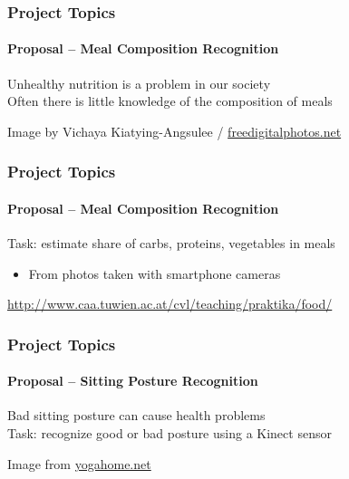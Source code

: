 \documentclass[xetex,professionalfont]{beamer}
\begin{document}
\begin{frame}
\frametitle{Project Topics}
\framesubtitle{Proposal -- Meal Composition Recognition}

Unhealthy nutrition is a problem in our society\\\medskip
Often there is little knowledge of the composition of meals

\bigskip
\begin{center}
	{\centering Image by Vichaya Kiatying-Angsulee / \url{freedigitalphotos.net}}
\end{center}

\end{frame}


\begin{frame}
\frametitle{Project Topics}
\framesubtitle{Proposal -- Meal Composition Recognition}

Task: estimate share of carbs, proteins, vegetables in meals
\begin{itemize}
	\item From photos taken with smartphone cameras
\end{itemize}

\medskip
\begin{center}
	\small\url{http://www.caa.tuwien.ac.at/cvl/teaching/praktika/food/}
\end{center}

\end{frame}


\begin{frame}
\frametitle{Project Topics}
\framesubtitle{Proposal -- Sitting Posture Recognition}

Bad sitting posture can cause health problems\\\medskip
Task: recognize good or bad posture using a Kinect sensor

\bigskip
\begin{center}
	{\centering Image from \url{yogahome.net}}
\end{center}

\end{frame}
\end{document}
